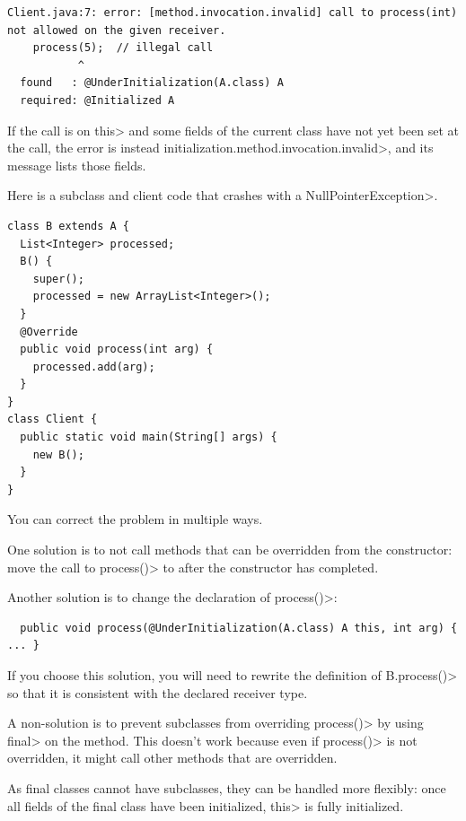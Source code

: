\begin{Verbatim}
Client.java:7: error: [method.invocation.invalid] call to process(int) not allowed on the given receiver.
    process(5);  // illegal call
           ^
  found   : @UnderInitialization(A.class) A
  required: @Initialized A
\end{Verbatim}

\noindent
If the call is on \<this> and some fields of the current class have not yet
been set at the call, the error is instead
\<initialization.method.invocation.invalid>, and its message lists those
fields.

Here is a subclass and client code that crashes with a \<NullPointerException>.

\begin{Verbatim}
class B extends A {
  List<Integer> processed;
  B() {
    super();
    processed = new ArrayList<Integer>();
  }
  @Override
  public void process(int arg) {
    processed.add(arg);
  }
}
class Client {
  public static void main(String[] args) {
    new B();
  }
}
\end{Verbatim}

You can correct the problem in multiple ways.

One solution is to not call methods that can be overridden from the
constructor:  move the call to \<process()> to after the constructor has
completed.

Another solution is to change the declaration of \<process()>:

\begin{Verbatim}
  public void process(@UnderInitialization(A.class) A this, int arg) { ... }
\end{Verbatim}

If you choose this solution, you will need to rewrite the definition of
\<B.process()> so that it is consistent with the declared receiver type.

A non-solution is to prevent subclasses from overriding \<process()> by
using \<final> on the method.  This doesn't work because even if
\<process()> is not overridden, it might call other methods that are
overridden.

As final classes cannot have subclasses, they can be handled more
flexibly: once all fields of the final class have been
initialized, \<this> is fully initialized.




